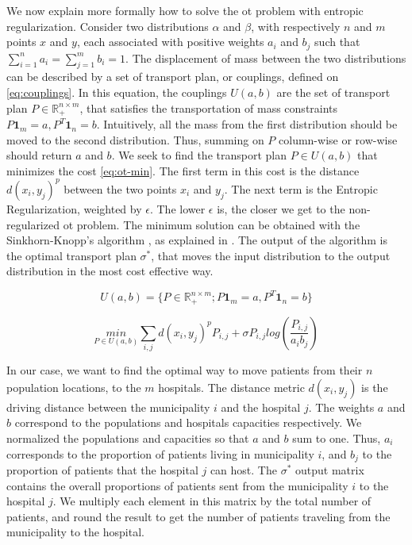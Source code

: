 We now explain more formally how to solve the \ac{ot} problem with entropic
regularization. Consider two distributions $\alpha$ and $\beta$, with
respectively $n$ and $m$ points $x$ and $y$, each associated with positive weights
$a_i$ and $b_j$ such that $\sum_{i=1}^{n} a_i = \sum_{j=1}^{m} b_i = 1$. The
displacement of mass between the two distributions can be described by a
set of transport plan, or couplings, defined on \cref{eq:couplings}. In
this equation, the couplings $U(a, b)$ are the set of transport plan
$P \in \mathbb{R}_{+}^{n \times m}$, that satisfies the transportation of mass
constraints $P \mathbf{1}_m = a, P^T \mathbf{1}_n = b$. Intuitively, all
the mass from the first distribution should be moved to the second
distribution. Thus, summing on $P$ column-wise or row-wise should return $a$
and $b$. We seek to find the transport plan $P \in U(a, b)$ that minimizes the
cost \cref{eq:ot-min}. The first term in this cost is the distance $d(x_i, y_j)^p$ between
the two points $x_i$ and $y_j$. The next term is the Entropic Regularization,
weighted by $\epsilon$. The lower $\epsilon$ is, the closer we get to the
non-regularized \ac{ot} problem. The minimum solution can be obtained
with the Sinkhorn-Knopp's algorithm \cite{knopp_concerning_1967}, as
explained in \cite{peyre_computational_2020,cuturi_sinkhorn_2013}. The output
of the algorithm is the optimal transport plan $\sigma^*$, that moves the input
distribution to the output distribution in the most cost effective way.

\begin{equation}
    U(a, b) = \lbrace P \in \mathbb{R}_{+}^{n \times m} ; P \mathbf{1}_m = a, P^T \mathbf{1}_n = b \rbrace
    \label{eq:couplings}
\end{equation}

\begin{equation}
    \underset{P \in U(a, b)}{min} \sum_{i,j} d(x_i, y_j)^p P_{i,j} + \sigma P_{i,j} log(\frac{P_{i,j}}{a_i b_j})
    \label{eq:ot-min}
\end{equation}

In our case, we want to find the optimal way to move patients from their
$n$ population locations, to the $m$ hospitals. The distance metric
$d(x_i, y_j)$ is the driving distance between the municipality $i$ and the
hospital $j$. The weights $a$ and $b$ correspond to the populations and
hospitals capacities respectively. We normalized the populations and capacities
so that $a$ and $b$ sum to one. Thus, $a_i$ corresponds to the proportion of
patients living in municipality $i$, and $b_j$ to the proportion of patients
that the hospital $j$ can host. The $\sigma^*$ output matrix contains the
overall proportions of patients sent from the municipality $i$ to the
hospital $j$. We multiply each element in this matrix by the total number of
patients, and round the result to get the number of patients traveling from
the municipality to the hospital.

